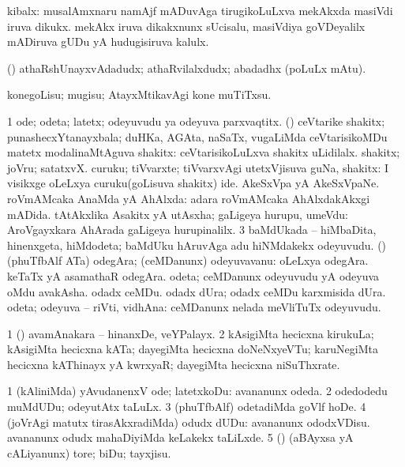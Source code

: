 \bentry
{}
\gl{\nA}
\bmng
kibalx: 
\banum
{} musalAmxnaru namAjf mADuvAga tirugikoLuLxva mekAkxda masiVdi iruva dikukx. 
 mekAkx iruva dikakxnunx sUcisalu, masiVdiya goVDeyalilx mADiruva gUDu yA hudugisiruva kalulx. 
\eanum
\emng
\eentry

\bentry
{}
\gl{\nA}
\bmng
(\ashi) athaRshUnayxvAdadudx; athaRvilalxdudx; abadadhx (poLuLx mAtu). 
\emng

\noindent
\gl{\nuga}
\bmng
{} konegoLisu; mugisu; AtayxMtikavAgi kone muTiTxsu. 
\emng
\eentry

\bentry
{}
\gl{\nA}
\bmng
\bnum
\num{1} ode; odeta; latetx; odeyuvudu ya odeyuva parxvaqtitx. 
 (\AmA) 
\banum
{} ceVtarike shakitx; punashecxYtanayxbala; duHKa, AGAta, naSaTx, \mo vugaLiMda ceVtarisikoMDu matetx modalinaMtAguva shakitx:  ceVtarisikoLuLxva shakitx uLidilalx. 
 shakitx; joVru; satatxvX. 
 curuku; tiVvarxte; tiVvarxvAgi utetxVjisuva guNa, shakitx:  I visikxge oLeLxya curuku(goLisuva shakitx) ide. 
 AkeSxVpa yA AkeSxVpaNe. 
 roVmAMcaka AnaMda yA AhAlxda:  adara roVmAMcaka AhAlxdakAkxgi mADida. 
 tAtAkxlika Asakitx yA utAsxha; gaLigeya hurupu, umeVdu:  AroVgayxkara AhArada gaLigeya hurupinalilx. 
\eanum
\numie
\num{3} baMdUkada -- hiMbaDita, hinenxgeta, hiMdodeta; baMdUku hAruvAga adu hiNMdakekx odeyuvudu. 
 (\birx) (phuTfbAlf ATa) 
\banum
{} odegAra; (ceMDanunx) odeyuvavanu:  oLeLxya odegAra.  keTaTx yA asamathaR odegAra. 
 odeta; ceMDanunx odeyuvudu yA odeyuva oMdu avakAsha. 
 odadx ceMDu. 
 odadx dUra; odadx ceMDu karxmisida dUra. 
 odeta; odeyuva -- riVti, vidhAna:  ceMDanunx nelada meVliTuTx odeyuvudu. 
\eanum
\numie
\enum
\emng

\noindent
\gl{\nuga}
\bmng
\bnum
\num{1}   (\AmA) avamAnakara -- hinanxDe, veYPalayx. 
\num{2}  kAsigiMta hecicxna kirukuLa; kAsigiMta hecicxna kATa; dayegiMta hecicxna doNeNxyeVTu; karuNegiMta hecicxna kAThinayx yA kwrxyaR; dayegiMta hecicxna niSuThxrate. 
\enum
\emng
\eentry

\bentry
{}
\gl{\sakirx}
\bmng
\bnum
\num{1} (kAliniMda) yAvudanenxV ode; latetxkoDu:  avananunx odeda. 
\num{2} odedodedu muMdUDu; odeyutAtx taLuLx. 
\num{3} (phuTfbAlf) odetadiMda goVlf hoDe. 
\num{4} (joVrAgi matutx tirasAkxradiMda) odudx dUDu:  avananunx ododxVDisu.  avananunx odudx mahaDiyiMda keLakekx taLiLxde. 
\num{5} (\ashi) (aBAyxsa yA cALiyanunx) tore; biDu; tayxjisu. 
\enum
\emng

